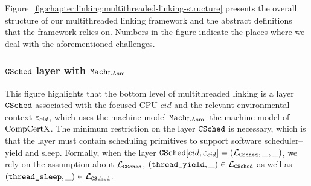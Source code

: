 Figure~\ref{fig:chapter:linking:multithreaded-linking-structure} 
presents the overall structure of our multithreaded linking framework and the abstract definitions that the framework relies on. 
Numbers in the figure indicate the places where we deal with the aforementioned challenges.

\subsubsection{${{\mathrm{\texttt{CSched}}}}$ layer with ${\mathrm{\texttt{Mach}}}_{\mathrm{LAsm}}$} 


This figure highlights that the bottom level of multithreaded linking is a layer ${{\mathrm{\texttt{CSched}}}}$ associated  with the focused CPU $cid$ and the relevant environmental context ${\varepsilon}_{cid}$, 
which uses the machine model ${\mathrm{\texttt{Mach}}}_{\mathrm{LAsm}}$--the machine model of $\mathrm{CompCertX}$. 
The minimum restriction on the layer ${{\mathrm{\texttt{CSched}}}}$ is necessary, 
which is that the layer must contain scheduling primitives to support software scheduler--yield and sleep.
Formally, 
when the layer ${{\mathrm{\texttt{CSched}}}}[cid, {\varepsilon}_{cid}] = (\mathcal{L}_{{{\mathrm{\texttt{CSched}}}}}, \_, \_)$,
we rely on the assumption about $\mathcal{L}_{{{\mathrm{\texttt{CSched}}}}}$, 
$({\mathrm{\texttt{thread\_yield}}}, \_) \in \mathcal{L}_{{{\mathrm{\texttt{CSched}}}}}$ as well as 
$({\mathrm{\texttt{thread\_sleep}}}, \_) \in \mathcal{L}_{{{\mathrm{\texttt{CSched}}}}}$. 


